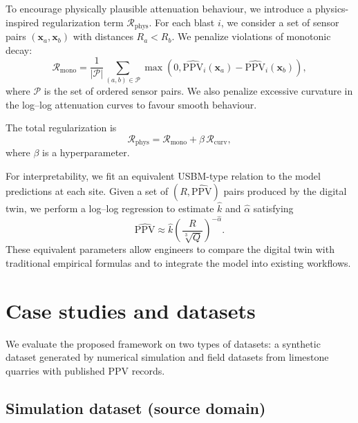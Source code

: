 \documentclass[a4paper,fleqn]{cas-sc}
\begin{document}
To encourage physically plausible attenuation behaviour,
we introduce a physics-inspired regularization term $\mathcal{R}_\mathrm{phys}$.
For each blast $i$, we consider a set of sensor pairs $(\mathbf{x}_a,\mathbf{x}_b)$ with distances $R_a < R_b$.
We penalize violations of monotonic decay:
\begin{equation}
    \mathcal{R}_\mathrm{mono}
    = \frac{1}{|\mathcal{P}|}
      \sum_{(a,b) \in \mathcal{P}}
      \max\left( 0, \hat{\mathrm{PPV}}_{i}(\mathbf{x}_a) - \hat{\mathrm{PPV}}_{i}(\mathbf{x}_b) \right),
\end{equation}
where $\mathcal{P}$ is the set of ordered sensor pairs.
We also penalize excessive curvature in the log--log attenuation curves
to favour smooth behaviour.

The total regularization is
\begin{equation}
    \mathcal{R}_\mathrm{phys} = \mathcal{R}_\mathrm{mono} + \beta \, \mathcal{R}_\mathrm{curv},
\end{equation}
where $\beta$ is a hyperparameter.

For interpretability, we fit an equivalent USBM-type relation
to the model predictions at each site.
Given a set of $(R,\hat{\mathrm{PPV}})$ pairs produced by the digital twin,
we perform a log--log regression to estimate $\hat{k}$ and $\hat{\alpha}$ satisfying
\begin{equation}
    \hat{\mathrm{PPV}} \approx \hat{k} \left(\frac{R}{\sqrt[3]{Q}}\right)^{-\hat{\alpha}}.
\end{equation}
These equivalent parameters allow engineers to compare the digital twin
with traditional empirical formulas and to integrate the model into existing workflows.

\section{Case studies and datasets}
\label{sec:data}

We evaluate the proposed framework on two types of datasets:
a synthetic dataset generated by numerical simulation
and field datasets from limestone quarries with published PPV records.

\subsection{Simulation dataset (source domain)}
\end{document}
